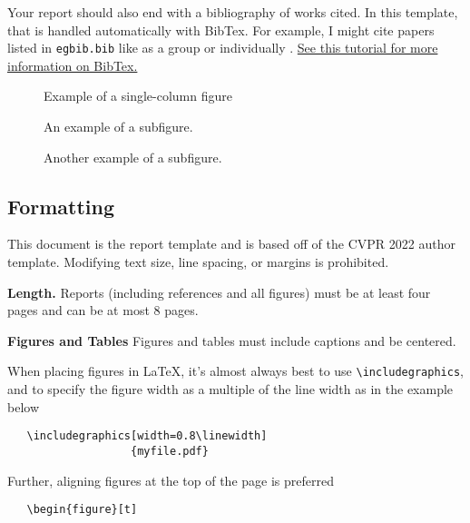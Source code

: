 \documentclass[10pt,twocolumn,letterpaper]{article}
\newcommand{\xhdr}[1]{\vspace{3pt}\noindent\textbf{#1}}
\begin{document}
\noindent Your report should also end with a bibliography of works cited.  In this template, that is handled automatically with BibTex. For example, I might cite papers listed in \texttt{egbib.bib} like \cite{Alpher04, Alpher02, ALpher03} as a group or individually \cite{Alpher05}. \href{https://www.overleaf.com/learn/latex/Bibliography_management_with_bibtex}{See this tutorial for more information on BibTex.}

\begin{figure}[t]
    \centering
    \fbox{\rule{0pt}{2in} \rule{.9\linewidth}{0pt}}
    \caption{Example of a single-column figure}
    \label{fig:my_label_single}
\end{figure}
\begin{figure*}[t]
  \centering
  \begin{subfigure}{0.68\linewidth}
    \fbox{\rule{0pt}{2in} \rule{.9\linewidth}{0pt}}
    \caption{An example of a subfigure.}
    \label{fig:short-a}
  \end{subfigure}
  \hfill
  \begin{subfigure}{0.28\linewidth}
    \fbox{\rule{0pt}{2in} \rule{.9\linewidth}{0pt}}
    \caption{Another example of a subfigure.}
    \label{fig:short-b}
  \end{subfigure}
  \caption{Example of two-column figure with subfigures.}
  \label{fig:short}
\end{figure*}

\subsection{Formatting}
This document is the report template and is based off of the CVPR 2022 author template. Modifying text size, line spacing, or margins is prohibited. 

\xhdr{Length.} Reports (including references and all figures) must be at least four pages and can be at most 8 pages. 




\xhdr{Figures and Tables} Figures and tables must include captions and be centered. 

When placing figures in \LaTeX, it's almost always best to use \verb+\includegraphics+, and to specify the figure width as a multiple of the line width as in the example below
{\small\begin{verbatim}
   \includegraphics[width=0.8\linewidth]
                   {myfile.pdf}
\end{verbatim}
}
\noindent Further, aligning figures at the top of the page is preferred {\small\begin{verbatim}
   \begin{figure}[t]
\end{verbatim}
}
\end{document}
